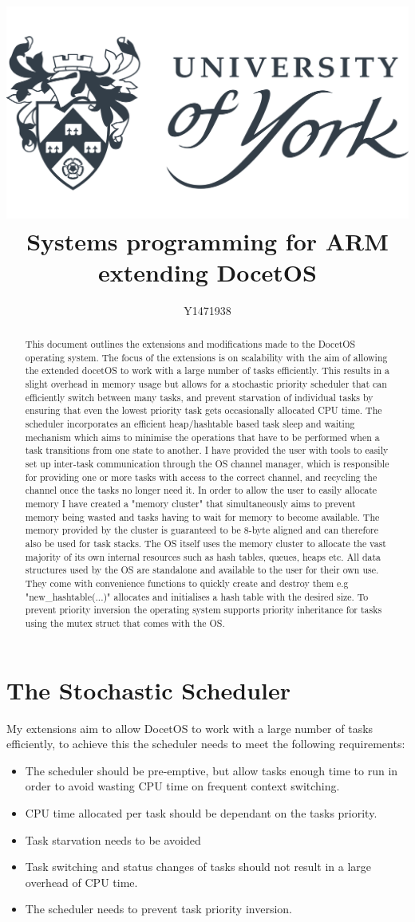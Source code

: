 \documentclass[12pt,a4paper]{article}
\author{Y1471938}
\title{
\includegraphics[width=\textwidth]{images/yorkUniLogo.png}\\
\textbf{Systems programming for ARM}\\ extending DocetOS}
\begin{document}
\maketitle
\begin{abstract}
This document outlines the extensions and modifications made to the DocetOS operating system. The focus of the extensions is on scalability with the aim of allowing the extended docetOS to work with a large number of tasks efficiently. This results in a slight overhead in memory usage but allows for a stochastic priority scheduler that can efficiently switch between many tasks, and prevent starvation of individual tasks by ensuring that even the lowest priority task gets occasionally allocated CPU time. The scheduler incorporates an efficient heap/hashtable based task sleep and waiting mechanism which aims to minimise the operations that have to be performed when a task transitions from one state to another. I have provided the user with tools to easily set up inter-task communication through the OS channel manager, which is responsible for providing one or more tasks with access to the correct channel, and recycling the channel once the tasks no longer need it. In order to allow the user to easily allocate memory I have created a "memory cluster" that simultaneously aims to prevent memory being wasted and tasks having to wait for memory to become available. The memory provided by the cluster is guaranteed to be 8-byte aligned and can therefore also be used for task stacks. The OS itself uses the memory cluster to allocate the vast majority of its own internal resources such as hash tables, queues, heaps etc. All data structures used by the OS are standalone and available to the user for their own use. They come with convenience functions to quickly create and destroy them e.g "new\_hashtable(...)" allocates and initialises a hash table with the desired size. To prevent priority inversion the operating system supports priority inheritance for tasks using the mutex struct that comes with the OS.
\end{abstract}
\pagebreak
\tableofcontents
\pagebreak
\section{The Stochastic Scheduler}
My extensions aim to allow DocetOS to work with a large number of tasks efficiently, to achieve this the scheduler needs to meet the following requirements:
\begin{itemize}
\setlength\itemsep{0.0em}
  \item The scheduler should be pre-emptive, but allow tasks enough time to run in order to avoid wasting CPU time on frequent context switching.
  \item CPU time allocated per task should be dependant on the tasks priority.
  \item Task starvation needs to be avoided
  \item Task switching and status changes of tasks should not result in a large overhead of CPU time.
  \item The scheduler needs to prevent task priority inversion.
\end{itemize}
\end{document}
